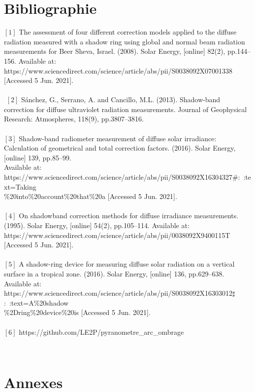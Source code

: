 \documentclass[12pt,a4paper]{article}
\begin{document}
\begin{flushleft}
\newpage

\section{Bibliographie}


$[1]$ The assessment of four different correction models applied to the diffuse radiation measured with a shadow ring using global and normal beam radiation measurements for Beer Sheva, Israel. (2008). Solar Energy, [online] 82(2), pp.144–156. Available at: https://www.sciencedirect.com/science/article/abs/pii/S0038092X07001338 [Accessed 5 Jun. 2021].\\
~\\
‌
$[2]$ Sánchez, G., Serrano, A. and Cancillo, M.L. (2013). Shadow-band correction for diffuse ultraviolet radiation measurements. Journal of Geophysical Research: Atmospheres, 118(9), pp.3807–3816.\\

‌~\\
$[3]$ Shadow-band radiometer measurement of diffuse solar irradiance: Calculation of geometrical and total correction factors. (2016). Solar Energy, [online] 139, pp.85–99.\\ 
Available at: https://www.sciencedirect.com/science/article/abs/pii/S0038092X16304327\#:~:text=Taking\\\%20into\%20account\%20that\%20a [Accessed 5 Jun. 2021].\\

‌~\\
$[4]$ On shadowband correction methods for diffuse irradiance measurements. (1995). Solar Energy, [online] 54(2), pp.105–114. Available at: https://www.sciencedirect.com/science/article/abs/pii/0038092X9400115T [Accessed 5 Jun. 2021].\\

‌~\\
$[5]$ A shadow-ring device for measuring diffuse solar radiation on a vertical surface in a tropical zone. (2016). Solar Energy, [online] 136, pp.629–638. Available at: https://www.sciencedirect.com/science/article/abs/pii/S0038092X16303012$\sharp$:~:text=A\%20shadow\\\%2Dring\%20device\%20is [Accessed 5 Jun. 2021].\\
‌~\\
$[6]$ https://github.com/LE2P/pyranometre\_arc\_ombrage

\newpage

‌\section{Annexes}


\end{flushleft}
\end{document}
